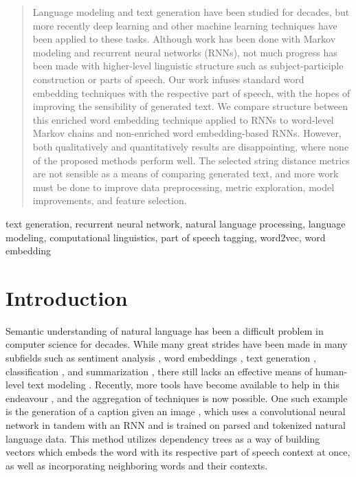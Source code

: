 \documentclass[conference]{IEEEtran}
\begin{document}
\begin{abstract}
Language modeling and text generation have been studied for decades, but more recently deep learning and other machine learning techniques have been applied to these tasks. Although work has been done with Markov modeling and recurrent neural networks (RNNs), not much progress has been made with higher-level linguistic structure such as subject-participle construction or parts of speech.  Our work infuses standard word embedding techniques with the respective part of speech, with the hopes of improving the sensibility of generated text.  We compare structure between this enriched word embedding technique applied to RNNs to word-level Markov chains and non-enriched word embedding-based RNNs.  However, both qualitatively and quantitatively results are disappointing, where none of the proposed methods perform well.  The selected string distance metrics are not sensible as a means of comparing generated text, and more work must be done to improve data preprocessing, metric exploration, model improvements, and feature selection.
\end{abstract}

\begin{IEEEkeywords}
text generation, recurrent neural network, natural language processing, language modeling, computational linguistics, part of speech tagging, word2vec, word embedding
\end{IEEEkeywords}

\section{Introduction}
Semantic understanding of natural language has been a difficult problem in computer science for decades. \cite{linell2004written} While many great strides have been made in many subfields such as sentiment analysis \cite{medhat2014sentiment}, word embeddings \cite{DBLP:journals/corr/MikolovSCCD13}, text generation \cite{sutskever2011generating}, classification \cite{dumais2001methods}, and summarization \cite{Goldstein:1999:STD:312624.312665}, there still lacks an effective means of human-level text modeling \cite{WENYIN20104031}\cite{YAN201715}\cite{BICALHO201766}. Recently, more tools have become available to help in this endeavour \cite{DBLP:journals/corr/MikolovSCCD13}\cite{bird2004nltk}\cite{honnibal2015improved}, and the aggregation of techniques is now possible. One such example is the generation of a caption given an image \cite{johnson2016densecap}, which uses a convolutional neural network in tandem with an RNN and is trained on parsed and tokenized natural language data.  This method utilizes dependency trees as a way of building vectors which embeds the word with its respective part of speech context at once, as well as incorporating neighboring words and their contexts.
\end{document}
